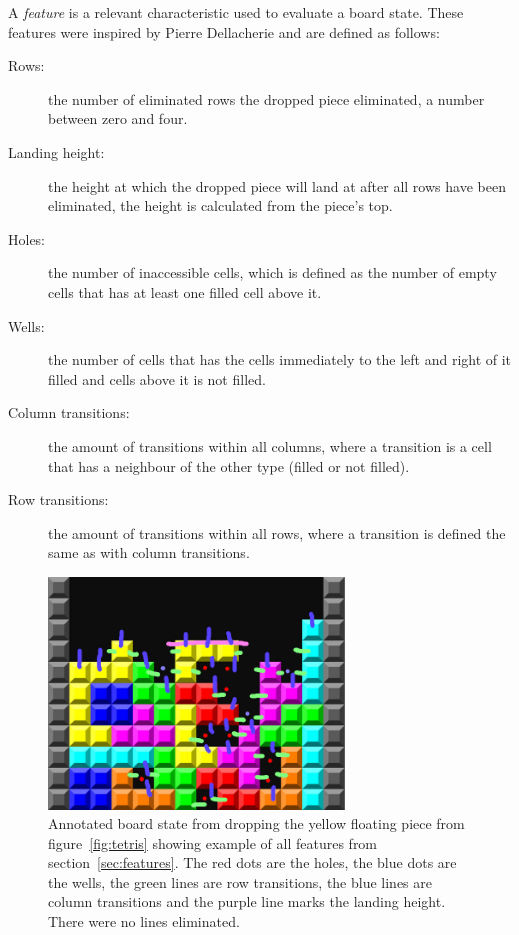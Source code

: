 \documentclass{article}
\begin{document}
A \emph{feature} is a relevant characteristic used to evaluate a board state. These features were inspired by Pierre Dellacherie\cite{TetrisML} and are defined as follows:

\begin{description}
    \item[Rows:] the number of eliminated rows the dropped piece eliminated, a number between zero and four.
    \item[Landing height:] the height at which the dropped piece will land at after all rows have been eliminated, the height is calculated from the piece's top.
    \item[Holes:] the number of inaccessible cells, which is defined as the number of empty cells that has at least one filled cell above it.
    \item[Wells:] the number of cells that has the cells immediately to the left and right of it filled and cells above it is not filled.
    \item[Column transitions:] the amount of transitions within all columns, where a transition is a cell that has a neighbour of the other type (filled or not filled).
    \item[Row transitions:] the amount of transitions within all rows, where a transition is defined the same as with column transitions.
\end{description}

\begin{figure}[t]
    \centering
    \includegraphics[width=0.7\textwidth]{tetris_annotated.jpg}
    \caption{Annotated board state from dropping the yellow floating piece from figure~\ref{fig:tetris} showing example of all features from section~\ref{sec:features}. The red dots are the holes, the blue dots are the wells, the green lines are row transitions, the blue lines are column transitions and the purple line marks the landing height. There were no lines eliminated.}
    \label{fig:tetris:anot}
\end{figure}
\end{document}
